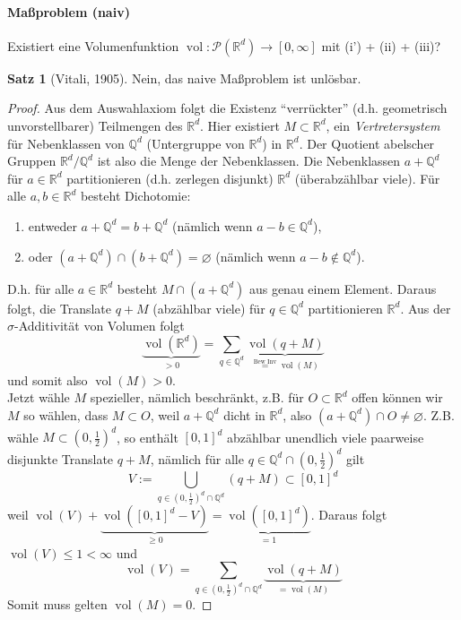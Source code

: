 \documentclass[12pt,a4paper]{article}
\theoremstyle{definition}
\newtheorem*{satz}{Satz}
\theoremstyle{remark}
\newcommand{\R}{\mathbb{R}}
\newcommand{\vol}{\operatorname{vol}}
\renewcommand{\emptyset}{\varnothing}
\begin{document}
\paragraph{Maßproblem (naiv)} Existiert eine Volumenfunktion $\vol: \mathcal{P}(\R^d) \longrightarrow [0,\infty]$ mit (i') + (ii) + (iii)?
\begin{satz}[Vitali, 1905] Nein, das naive Maßproblem ist unlösbar.
\begin{proof}
Aus dem Auswahlaxiom folgt die Existenz ``verrückter'' (d.h. geometrisch unvorstellbarer) Teilmengen des $\R^d$. Hier existiert $M \subset \R^d$, ein \emph{Vertretersystem} für Nebenklassen von $\mathbb{Q}^d$ (Untergruppe von $\R^d$) in $\R^d$. Der Quotient abelscher Gruppen $\R^d/\mathbb{Q}^d$ ist also die Menge der Nebenklassen. Die Nebenklassen $a+\mathbb{Q}^d$ für $a\in \R^d$ partitionieren (d.h. zerlegen disjunkt) $\R^d$ (überabzählbar viele). Für alle $a,b \in \R^d$ besteht Dichotomie:
\begin{enumerate}[label=\roman*),topsep=3pt, itemsep=0pt]
\item entweder $a+\mathbb{Q}^d = b + \mathbb{Q}^d$ (nämlich wenn $a-b \in \mathbb{Q}^d$),
\item oder $(a+\mathbb{Q}^d)\cap (b+\mathbb{Q}^d) = \emptyset$ (nämlich wenn $a-b \notin \mathbb{Q}^d$).
\end{enumerate}
D.h. für alle $a\in \R^d$ besteht $M \cap (a+\mathbb{Q}^d)$ aus genau einem Element. Daraus folgt, die Translate $q+M$ (abzählbar viele) für $q \in \mathbb{Q}^d$ partitionieren $\R^d$. Aus der $\sigma$-Additivität von Volumen folgt
\begin{equation}
\underbrace{\vol (\R^d)}_{>0}= \sum_{q \in \mathbb{Q}^d} \underbrace{\vol (q+M)}_{\overset{\text{Bew Inv}}{=} \vol(M)}
\end{equation} 
und somit also $\vol (M)>0$.\\
Jetzt wähle $M$ spezieller, nämlich beschränkt, z.B. für $O\subset \R^d$ offen können wir $M$ so wählen, dass $M\subset O$, weil $a+\mathbb{Q}^d$ dicht in $\R^d$, also $(a+\mathbb{Q}^d)\cap O \neq \emptyset$. Z.B. wähle $M \subset (0,\frac{1}{2})^d$, so enthält $[0,1]^d$ abzählbar unendlich viele paarweise disjunkte Translate $q+M$, nämlich für alle $q\in \mathbb{Q}^d \cap (0,\frac{1}{2})^d$ gilt
\begin{equation}
V:= \bigcup_{q\in(0,\frac{1}{2})^d \cap \mathbb{Q}^d} (q+M) \subset [0,1]^d
\end{equation}
weil $\vol (V) + \underbrace{\vol ([0,1]^d-V)}_{\geq 0} = \underbrace{\vol ([0,1]^d)}_{=1}$. Daraus folgt $\vol (V) \leq 1 < \infty$ und 
\begin{equation}
\vol(V) = \sum_{q\in(0,\frac{1}{2})^d \cap \mathbb{Q}^d} \underbrace{\vol (q+M)}_{=\vol(M)}
\end{equation}
Somit muss gelten $\vol(M)=0$. \Lightning
\end{proof}
\end{satz}
\end{document}
